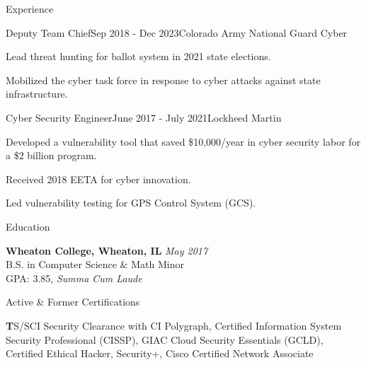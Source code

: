 \documentclass[
	11pt, %
]{resume} %
\begin{document}
\begin{rSection}{Experience}

	\begin{rSubsection}{Deputy Team Chief}{Sep 2018 - Dec 2023}{Colorado Army National Guard Cyber}
		\item Lead threat hunting for ballot system in 2021 state elections.
		\item Mobilized the cyber task force in response to cyber attacks against state infrastructure.
	\end{rSubsection}


	\begin{rSubsection}{Cyber Security Engineer}{June 2017 - July 2021}{Lockheed Martin}
		\item Developed a vulnerability tool that saved \$10,000/year in cyber security labor for a \$2 billion program.
		\item Received 2018 EETA for cyber innovation.
		\item Led vulnerability testing for GPS Control System (GCS).
	\end{rSubsection}
\end{rSection}


\begin{rSection}{Education}
	
	\textbf{Wheaton College, Wheaton, IL} \hfill \textit{May 2017} \\ 
	B.S. in Computer Science \& Math Minor \\
	GPA: 3.85, \textit{Summa Cum Laude} \\
	
\end{rSection}

\begin{rSection}{Active \& Former Certifications}

	\textbf TS/SCI Security Clearance with CI Polygraph, Certified Information System Security Professional (CISSP),  GIAC Cloud Security Essentials (GCLD), Certified Ethical Hacker, Security+, Cisco Certified Network Associate

\end{rSection}

\end{document}
